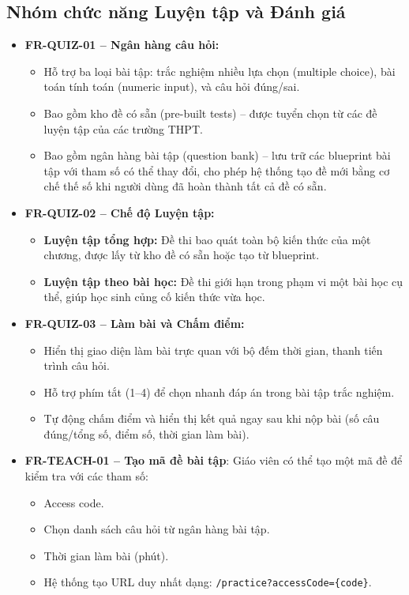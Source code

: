 \subsection{Nhóm chức năng Luyện tập và Đánh giá}

\begin{itemize}
    \item \textbf{FR-QUIZ-01 – Ngân hàng câu hỏi:}
    \begin{itemize}
        \item Hỗ trợ ba loại bài tập: trắc nghiệm nhiều lựa chọn (multiple choice), bài toán tính toán (numeric input), và câu hỏi đúng/sai.
        \item Bao gồm kho đề có sẵn (pre-built tests) – được tuyển chọn từ các đề luyện tập của các trường THPT.
        \item Bao gồm ngân hàng bài tập (question bank) – lưu trữ các blueprint bài tập với tham số có thể thay đổi, cho phép hệ thống tạo đề mới bằng cơ chế thế số khi người dùng đã hoàn thành tất cả đề có sẵn.
    \end{itemize}
    
    \item \textbf{FR-QUIZ-02 – Chế độ Luyện tập:}
    \begin{itemize}
        \item \textbf{Luyện tập tổng hợp:} Đề thi bao quát toàn bộ kiến thức của một chương, được lấy từ kho đề có sẵn hoặc tạo từ blueprint.
        \item \textbf{Luyện tập theo bài học:} Đề thi giới hạn trong phạm vi một bài học cụ thể, giúp học sinh củng cố kiến thức vừa học.
    \end{itemize}
    
    \item \textbf{FR-QUIZ-03 – Làm bài và Chấm điểm:}
    \begin{itemize}
        \item Hiển thị giao diện làm bài trực quan với bộ đếm thời gian, thanh tiến trình câu hỏi.
        \item Hỗ trợ phím tắt (1–4) để chọn nhanh đáp án trong bài tập trắc nghiệm.
        \item Tự động chấm điểm và hiển thị kết quả ngay sau khi nộp bài (số câu đúng/tổng số, điểm số, thời gian làm bài).
    \end{itemize}

    \item \textbf{FR-TEACH-01 – Tạo mã đề bài tập}: Giáo viên có thể tạo một mã đề để kiểm tra với các tham số:
        \begin{itemize}
        \item Access code.
        \item Chọn danh sách câu hỏi từ ngân hàng bài tập.
        \item Thời gian làm bài (phút).
        \item Hệ thống tạo URL duy nhất dạng: \texttt{/practice?accessCode=\{code\}}.
        \end{itemize}


\end{itemize}
